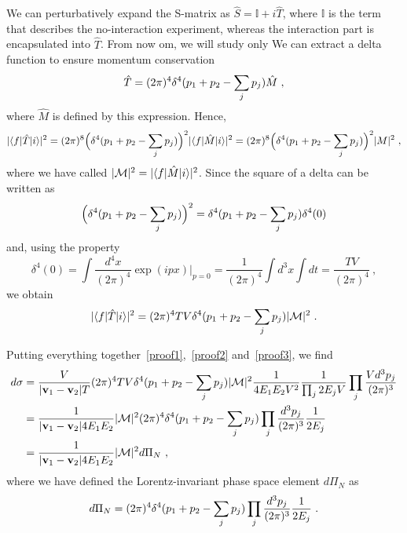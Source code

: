     We can perturbatively expand the S-matrix as $\hat S = \mathbb I + i \hat T$, where $\mathbb I$ is the term that describes the no-interaction experiment, whereas the interaction part is encapsulated into $\hat T$. From now om, we will study only We can extract a delta function to ensure momentum conservation
    \begin{equation*}
        \hat T = (2\pi)^4 \delta^4 (p_1 + p_2 - \small \sum_j p_j) \hat M ~,
    \end{equation*}
    where $\hat M$ is defined by this expression. Hence,
    \begin{equation*}
        |\langle f\vert \hat T \vert i\rangle |^2 = (2\pi)^8 \Big (\delta^4 (p_1 + p_2 - \small \sum_j p_j) \Big )^2 |\langle f\vert \hat M \vert i\rangle |^2 = (2\pi)^8 \Big (\delta^4 (p_1 + p_2 - \small \sum_j p_j) \Big )^2 |M|^2~,
    \end{equation*}
    where we have called $| \mathcal M |^2 = |\langle f\vert \hat M \vert i\rangle |^2$. Since the square of a delta can be written as 
    \begin{equation*}
        \Big (\delta^4 (p_1 + p_2 - \small \sum_j p_j) \Big )^2 = \delta^4 (p_1 + p_2 - \small \sum_j p_j) \delta^4 (0)
    \end{equation*}
    and, using the property 
    \begin{equation*}
        \delta^4 (0) = \int \frac{d^4 x}{(2\pi)^4} \exp(i p x) \Big \vert_{p=0} = \frac{1}{(2\pi)^4} \int d^3 x \int dt = \frac{T V}{(2\pi)^4} ~,
    \end{equation*}
    we obtain
    \begin{equation}\label{proof3}
        |\langle f\vert \hat T \vert i\rangle |^2 = (2\pi)^4 TV \delta^4 (p_1 + p_2 - \small \sum_j p_j) |\mathcal M |^2 ~.
    \end{equation}

    Putting everything together~\eqref{proof1},~\eqref{proof2} and~\eqref{proof3}, we find
    \begin{align*}
        d \sigma & = \frac{V}{|\mathbf v_1 - \mathbf v_2| T} (2\pi)^4 TV \delta^4 (p_1 + p_2 - \small \sum_j p_j) |\mathcal M |^2 \frac{1}{4 E_1 E_2 V^2} \frac{1}{\prod_j 2 E_j V} \prod_j \frac{V d^3 p_j}{(2\pi)^3} \\ & = \frac{1}{|\mathbf v_1 - \mathbf v_2| 4 E_1 E_2} |\mathcal M |^2 (2\pi)^4 \delta^4 (p_1 + p_2 - \small \sum_j p_j) \prod_j \frac{d^3 p_j}{(2\pi)^3} \frac{1}{2 E_j} \\ & = \frac{1}{|\mathbf v_1 - \mathbf v_2| 4 E_1 E_2} |\mathcal M |^2 d \Pi_N ~,
    \end{align*}
    where we have defined the Lorentz-invariant phase space element $d \Pi_N$ as 
    \begin{equation*}
        d \Pi_N = (2\pi)^4 \delta^4 (p_1 + p_2 - \small \sum_j p_j) \prod_j \frac{d^3 p_j}{(2\pi)^3} \frac{1}{2 E_j} ~.
    \end{equation*}

    